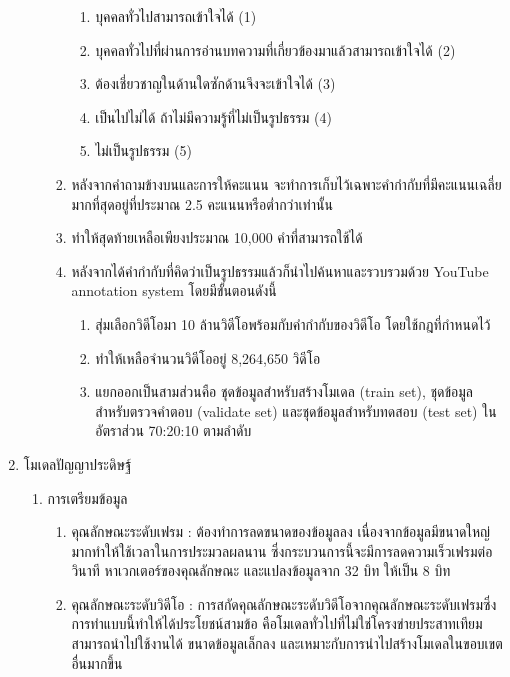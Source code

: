 \begin{enumerate}
\begin{enumerate}
\begin{enumerate}
\begin{enumerate}
				\setlength\itemsep{-0.25em}
				\item บุคคลทั่วไปสามารถเข้าใจได้ (1)
				\item บุคคลทั่วไปที่ผ่านการอ่านบทความที่เกี่ยวข้องมาแล้วสามารถเข้าใจได้ (2)
				\item ต้องเชี่ยวชาญในด้านใดซักด้านจึงจะเข้าใจได้ (3)
				\item เป็นไปไม่ได้ ถ้าไม่มีความรู้ที่ไม่เป็นรูปธรรม (4)
				\item ไม่เป็นรูปธรรม (5)
			\end{enumerate}
			\item หลังจากคำถามข้างบนและการให้คะแนน จะทำการเก็บไว้เฉพาะคำกำกับที่มีคะแนนเฉลี่ยมากที่สุดอยู่ที่ประมาณ 2.5 คะแนนหรือต่ำกว่าเท่านั้น
			\item ทำให้สุดท้ายเหลือเพียงประมาณ 10,000 คำที่สามารถใช้ได้
			\item หลังจากได้คำกำกับที่คิดว่าเป็นรูปธรรมแล้วก็นำไปค้นหาและรวบรวมด้วย YouTube annotation system โดยมีขั้นตอนดังนี้										
			\begin{enumerate}
				\setlength\itemsep{-0.25em}
				\item สุ่มเลือกวิดีโอมา 10 ล้านวิดีโอพร้อมกับคำกำกับของวิดีโอ โดยใช้กฎที่กำหนดไว้
				\item ทำให้เหลือจำนวนวิดีโออยู่ 8,264,650 วิดีโอ
				\item แยกออกเป็นสามส่วนคือ ชุดข้อมูลสำหรับสร้างโมเดล (train set), ชุดข้อมูลสำหรับตรวจคำตอบ (validate set) และชุดข้อมูลสำหรับทดสอบ (test set) ในอัตราส่วน 70:20:10 ตามลำดับ
			\end{enumerate}
		\end{enumerate}
	\end{enumerate}
	\item {โมเดลปัญญาประดิษฐ์}
	\begin{enumerate}
		\setlength\itemsep{-0.25em}
		\item การเตรียมข้อมูล
			\begin{enumerate}  
				\item คุณลักษณะระดับเฟรม : ต้องทำการลดขนาดของข้อมูลลง เนื่องจากข้อมูลมีขนาดใหญ่มากทำให้ใช้เวลาในการประมวลผลนาน ซึ่งกระบวนการนี้จะมีการลดความเร็วเฟรมต่อวินาที 
				หาเวกเตอร์ของคุณลักษณะ และแปลงข้อมูลจาก 32 บิท ให้เป็น 8 บิท
				\item คุณลักษณะระดับวิดีโอ : การสกัดคุณลักษณะระดับวิดีโอจากคุณลักษณะระดับเฟรมซึ่งการทำแบบนี้ทำให้ได้ประโยชน์สามข้อ 
				คือโมเดลทั่วไปที่ไม่ใช่โครงข่ายประสาทเทียมสามารถนำไปใช้งานได้ ขนาดข้อมูลเล็กลง และเหมาะกับการนำไปสร้างโมเดลในขอบเขตอื่นมากขึ้น
			\end{enumerate}	

\end{enumerate}
\end{enumerate}

